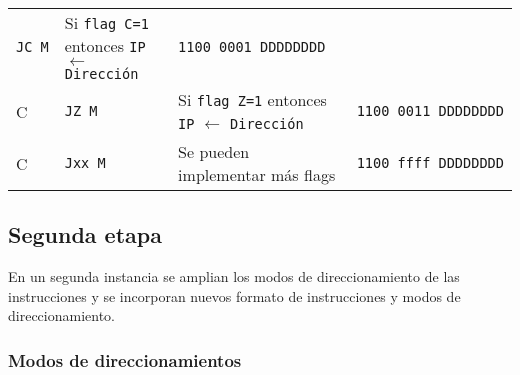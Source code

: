 \documentclass[12pt,twoside]{templates/unerthesis}
\begin{document}
\begin{longtable}[]{@{}llll@{}}
\begin{minipage}[t]{0.27\columnwidth}
\texttt{JC\ M}\strut
\end{minipage} & \begin{minipage}[t]{0.27\columnwidth}\raggedright
Si \texttt{flag\ C=1} entonces \texttt{IP} \(\leftarrow\) \texttt{Dirección}\strut
\end{minipage} & \begin{minipage}[t]{0.27\columnwidth}\raggedright
\texttt{1100\ 0001\ DDDDDDDD}\strut
\end{minipage}\tabularnewline
\begin{minipage}[t]{0.09\columnwidth}\raggedright
C\strut
\end{minipage} & \begin{minipage}[t]{0.27\columnwidth}\raggedright
\texttt{JZ\ M}\strut
\end{minipage} & \begin{minipage}[t]{0.27\columnwidth}\raggedright
Si \texttt{flag\ Z=1} entonces \texttt{IP} \(\leftarrow\) \texttt{Dirección}\strut
\end{minipage} & \begin{minipage}[t]{0.27\columnwidth}\raggedright
\texttt{1100\ 0011\ DDDDDDDD}\strut
\end{minipage}\tabularnewline
\begin{minipage}[t]{0.09\columnwidth}\raggedright
C\strut
\end{minipage} & \begin{minipage}[t]{0.27\columnwidth}\raggedright
\texttt{Jxx\ M}\strut
\end{minipage} & \begin{minipage}[t]{0.27\columnwidth}\raggedright
Se pueden implementar más flags\strut
\end{minipage} & \begin{minipage}[t]{0.27\columnwidth}\raggedright
\texttt{1100\ ffff\ DDDDDDDD}\strut
\end{minipage}\tabularnewline
\bottomrule
\end{longtable}

\hypertarget{segunda-etapa}{%
\subsection{Segunda etapa}\label{segunda-etapa}}

En un segunda instancia se amplian los modos de direccionamiento de las instrucciones y se incorporan nuevos formato de instrucciones y modos de direccionamiento.

\hypertarget{modos-de-direccionamientos-1}{%
\subsubsection{Modos de direccionamientos}\label{modos-de-direccionamientos-1}}
\end{document}
